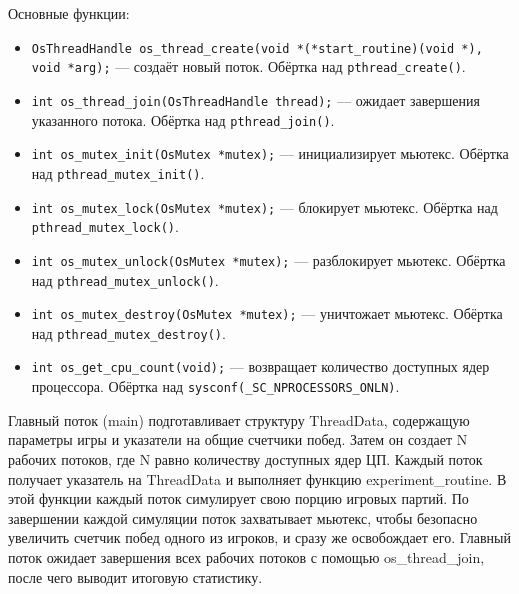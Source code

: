 \vspace{1\baselineskip}
Основные функции:
\begin{itemize}
    \item \texttt{OsThreadHandle os\_thread\_create(void *(*start\_routine)(void *), void *arg);} --- создаёт новый поток. Обёртка над \texttt{pthread\_create()}.
    \item \texttt{int os\_thread\_join(OsThreadHandle thread);} --- ожидает завершения указанного потока. Обёртка над \texttt{pthread\_join()}.
    \item \texttt{int os\_mutex\_init(OsMutex *mutex);} --- инициализирует мьютекс. Обёртка над \texttt{pthread\_mutex\_init()}.
    \item \texttt{int os\_mutex\_lock(OsMutex *mutex);} --- блокирует мьютекс. Обёртка над \texttt{pthread\_mutex\_lock()}.
    \item \texttt{int os\_mutex\_unlock(OsMutex *mutex);} --- разблокирует мьютекс. Обёртка над \texttt{pthread\_mutex\_unlock()}.
    \item \texttt{int os\_mutex\_destroy(OsMutex *mutex);} --- уничтожает мьютекс. Обёртка над \texttt{pthread\_mutex\_destroy()}.
    \item \texttt{int os\_get\_cpu\_count(void);} --- возвращает количество доступных ядер процессора. Обёртка над \texttt{sysconf(\_SC\_NPROCESSORS\_ONLN)}.
\end{itemize}

\vspace{2\baselineskip}

Главный поток (main) подготавливает структуру ThreadData, содержащую параметры игры и указатели на общие счетчики побед. Затем он создает N рабочих потоков, где N равно количеству доступных ядер ЦП. Каждый поток получает указатель на ThreadData и выполняет функцию experiment\_routine. В этой функции каждый поток симулирует свою порцию игровых партий. По завершении каждой симуляции поток захватывает мьютекс, чтобы безопасно увеличить счетчик побед одного из игроков, и сразу же освобождает его. Главный поток ожидает завершения всех рабочих потоков с помощью os\_thread\_join, после чего выводит итоговую статистику.